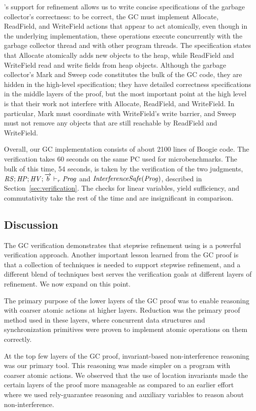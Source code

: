 \civl's support for refinement allows us to write concise specifications of the garbage collector's correctness:
to be correct, the GC must implement Allocate, ReadField, and WriteField actions that appear to act atomically,
even though in the underlying implementation,
these operations execute concurrently with the garbage collector thread and with other program threads.
The specification states that Allocate atomically adds new objects to the heap,
while ReadField and WriteField read and write fields from heap objects.
Although the garbage collector's Mark and Sweep code constitutes the bulk of the GC code,
they are hidden in the high-level specification;
they have detailed correctness specifications in the middle layers of the proof,
but the most important point at the high level is that their work not interfere with Allocate, ReadField, and WriteField.
In particular, Mark must coordinate with WriteField's write barrier,
and Sweep must not remove any objects that are still reachable by ReadField and WriteField.

Overall, our GC implementation consists of about 2100 lines of Boogie code.
The verification takes 60 seconds on the same PC used for microbenchmarks.
The bulk of this time, 54 seconds, is taken by the verification of the two judgments,
$\mathit{RS};\mathit{HP};\mathit{HV};\overrightarrow{b} \vdash_r \mathit{Prog}$ and $\mathit{InterferenceSafe}(\mathit{Prog})$, described in Section~\ref{sec:verification}.
The checks for linear variables, yield sufficiency, and commutativity take the rest of the time and are insignificant in comparison.

\subsection{Discussion}
The GC verification demonstrates that stepwise refinement using \civl is a
powerful verification approach. 
Another important lesson learned from the GC proof is that a collection
of techniques is needed to support stepwise refinement, and a different blend of
techniques best serves the verification goals at different layers of refinement. 
We now expand on this point. 

The primary purpose of the lower layers of the GC proof was to enable
reasoning with coarser atomic actions at higher layers. 
Reduction was the primary proof method used in these layers, where
concurrent data structures and synchronization primitives were proven
to implement atomic operations on them correctly. 

At the top few layers of the GC proof, invariant-based
non-interference reasoning was our primary tool. 
This reasoning was made simpler on a program with coarser
atomic actions. 
We observed that the use
of location invariants made the certain layers of the proof more
manageable as compared to an earlier effort where we used
rely-guarantee reasoning and auxiliary variables to reason about
non-interference.  

